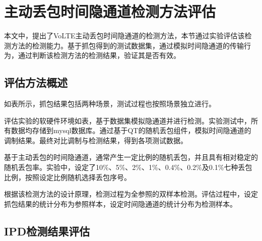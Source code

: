 \section{主动丢包时间隐通道检测方法评估}
\label{chap:analyze:result}

本文中，提出了VoLTE主动丢包时间隐通道的检测方法，本节通过实验评估该检测方法的检测能力。基于抓包得到的测试数据集，通过模拟时间隐通道的传输行为，通过判断该检测方法的检测结果，验证其是否有效。

\subsection{评估方法概述}
\label{chap:analyze:result:abstract}

如表所示，抓包结果包括两种场景，测试过程也按照场景独立进行。


评估实验的软硬件环境如表，基于数据集模拟隐通道并进行检测。实验测试中，所有数据均存储到mysql数据库。通过基于QT的随机丢包组件，模拟时间隐通道的调制结果。最终对比调制与检测结果，得到各项测试数据。

基于主动丢包的时间隐通道，通常产生一定比例的随机丢包，并且具有相对稳定的随机丢包率。实验中，设定了10\%、5\%、2\%、1\%、0.4\%、0.2\%及0.1\%七种丢包比例，按照设定比例随机选择丢包序号。

根据该检测方法的设计原理，检测过程为全参照的双样本检测。评估过程中，设定抓包结果的统计分布为参照样本，设定时间隐通道的统计分布为检测样本。

\subsection{IPD检测结果评估}
\label{chap:analyze:result:ipd}

